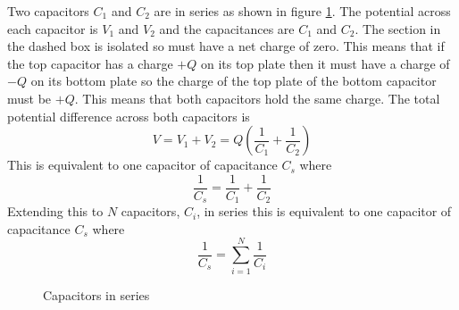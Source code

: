\documentclass{article}
\begin{document}
    Two capacitors \(C_1\) and \(C_2\) are in series as shown in figure \ref{fig:capacitors in series}.
    The potential across each capacitor is \(V_1\) and \(V_2\) and the capacitances are \(C_1\) and \(C_2\).
    The section in the dashed box is isolated so must have a net charge of zero.
    This means that if the top capacitor has a charge \(+Q\) on its top plate then it must have a charge of \(-Q\) on its bottom plate so the charge of the top plate of the bottom capacitor must be \(+Q\).
    This means that both capacitors hold the same charge.
    The total potential difference across both capacitors is
    \[V = V_1 + V_2 = Q\left(\frac{1}{C_1} + \frac{1}{C_2}\right)\]
    This is equivalent to one capacitor of capacitance \(C_s\) where
    \[\frac{1}{C_s} = \frac{1}{C_1} + \frac{1}{C_2}\]
    Extending this to \(N\) capacitors, \(C_i\), in series this is equivalent to one capacitor of capacitance \(C_s\) where
    \[\frac{1}{C_s} = \sum_{i=1}^N\frac{1}{C_i}\]
    
    \begin{figure}[ht]
        \centering
        \caption{Capacitors in series}
        \label{fig:capacitors in series}
    \end{figure}
    
\end{document}
